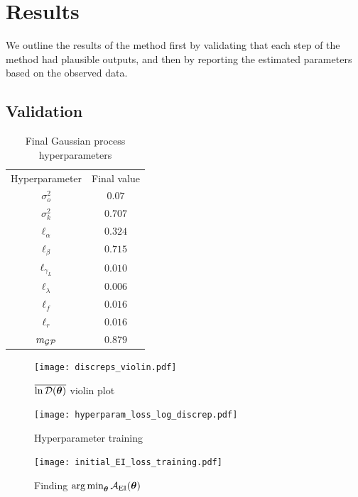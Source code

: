 \chapter{Results}

We outline the results of the method first by validating that each step of
the method had plausible outputs, and then by reporting the estimated
parameters based on the observed data.

\section{Validation}

\begin{table}[htbp]
    \caption{
        Final Gaussian process hyperparameters
    }
    \label{tab:trained_hps}
    \centering
    \begin{tabular}{c|c}
        Hyperparameter    & Final value \\
        $\sigma_o^2$      & $0.07$      \\
        $\sigma_k^2$      & $0.707$     \\
        $\ell_\alpha$     & $0.324$     \\
        $\ell_\beta$      & $0.715$     \\
        $\ell_{\gamma_L}$ & $0.010$     \\
        $\ell_\lambda$    & $0.006$     \\
        $\ell_f$          & $0.016$     \\
        $\ell_r$          & $0.016$     \\
        $m_{\mathcal{GP}}$           & $0.879$
    \end{tabular}
\end{table}

\begin{figure}[htbp]
    \centering
    \begin{minipage}[b]{0.33\textwidth}
        \centering
        \texttt{[image: discreps\_violin.pdf]}
        \caption{$\overline{\ln\mathcal{D}(\bm{\theta})}$ violin plot}
        \label{fig:violin}
    \end{minipage}
    \begin{minipage}[b]{0.66\textwidth}
        \centering
        \begin{minipage}[b]{\textwidth}
            \centering
            \texttt{[image: hyperparam\_loss\_log\_discrep.pdf]}
            \caption{Hyperparameter training}
            \label{fig:hyper_train}
        \end{minipage}
        \begin{minipage}[b]{\textwidth}
            \centering
            \texttt{[image: initial\_EI\_loss\_training.pdf]}
            \caption{Finding $\operatorname*{arg\,min}_{\bm{\theta}}\mathcal{A}_{\mathrm{EI}}(\bm{\theta})$}
            \label{fig:subEI}
        \end{minipage}
    \end{minipage}
\end{figure}

